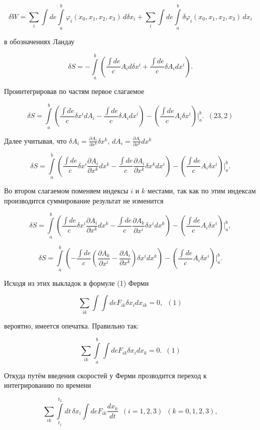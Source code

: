 \documentclass[11pt]{article}
\begin{document}
\[\delta W =  \sum\limits_i \int de \int\limits_{a}^{b}  \varphi_i(x_0, x_1, x_2, x_3) \,d \delta x_i + \sum\limits_i \int de \int\limits_{a}^{b} \delta \varphi_i(x_0, x_1, x_2, x_3) \,d x_i\]

    в обозначениях Ландау

\[\delta S = - \int\limits_{a}^{b} \left(\frac{\int de}{c}A_i d \delta x^i + \frac{\int de}{c}\delta A_i d x^i\right).\]

    Проинтегрировав по частям первое слагаемое

\[\delta S = \int\limits_{a}^{b} \left(\frac{\int de}{c} \delta x^i d A_i - \frac{\int de}{c}\delta A_i d x^i\right) -  \left(\frac{\int de}{c}A_i \delta x^i \right) \Bigg|_{a}^{b}.\,\,\,  (23,2)\]

    Далее учитывая, что
\(\delta A_i = \frac{\partial A_i}{\partial x^k} \delta x^k\),
\(d A_i = \frac{\partial A_i}{\partial x^k} d x^k\)

    \[\delta S = \int\limits_{a}^{b} \left(\frac{\int de}{c} \delta x^i \frac{\partial A_i}{\partial x^k} d x^k - \frac{\int de}{c}\frac{\partial A_i}{\partial x^k} \delta x^k d x^i\right) - \left(\frac{\int de}{c}A_i \delta x^i \right) \Bigg|_{a}^{b}.\]

    Во втором слагаемом поменяем индексы \(i\) и \(k\) местами, так как по
этим индексам производится суммирование результат не изменится

    \[\delta S = \int\limits_{a}^{b} \left(\frac{\int de}{c} \delta x^i \frac{\partial A_i}{\partial x^k} d x^k - \frac{\int de}{c}\frac{\partial A_k}{\partial x^i} \delta x^i d x^k\right) - \left(\frac{\int de}{c}A_i \delta x^i \right) \Bigg|_{a}^{b},\]

    \[\delta S = \int\limits_{a}^{b} \left( - \frac{\int de}{c}\left(\frac{\partial A_k}{\partial x^i} -\frac{\partial A_i}{\partial x^k}\right) \delta x^i d x^k\right) - \left(\frac{\int de}{c}A_i \delta x^i \right) \Bigg|_{a}^{b}.\]

    Исходя из этих выкладок в формуле (1) Ферми

    \[\sum_{ik} \int \int de F_{ik} \delta x_i dx_{ik} = 0, \,\,\,(1)\]

    вероятно, имеется опечатка. Правильно так:

    \[\sum_{ik} \int\limits_{a}^{b} \int de F_{ik} \delta x_i dx_{k} = 0. \,\,\,(1)\]

    Откуда путём введения скоростей у Ферми прозводится переход к
интегрированию по времени

    \[\sum_{ik} \int\limits_{t_1}^{t_2} dt \, \delta x_i \int de F_{ik}  \frac{dx_{k}}{dt} \,\,\,(i = 1,2,3)\,\,\,(k = 0,1,2,3),\]
\end{document}
